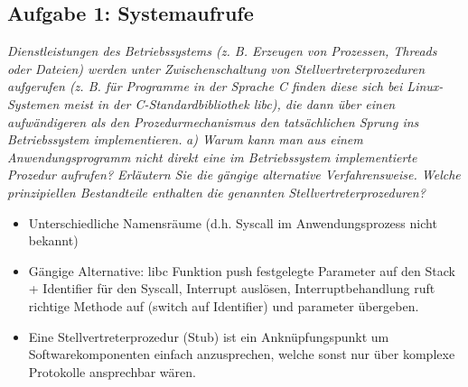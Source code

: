 \documentclass[a4paper]{article}
\begin{document}
\subsection{Aufgabe 1: Systemaufrufe}
\textit{Dienstleistungen des Betriebssystems (z. B. Erzeugen von Prozessen, Threads oder Dateien) werden unter Zwischenschaltung von Stellvertreterprozeduren aufgerufen (z. B. für Programme in der Sprache C finden diese sich bei Linux-Systemen meist in der C-Standardbibliothek libc), die dann über einen aufwändigeren als den Prozedurmechanismus den tatsächlichen Sprung ins Betriebssystem implementieren.}
\vspace{10mm}
\textit{a) Warum kann man aus einem Anwendungsprogramm nicht direkt eine im Betriebssystem implementierte Prozedur aufrufen? Erläutern Sie die gängige alternative Verfahrensweise. Welche prinzipiellen Bestandteile enthalten die genannten Stellvertreterprozeduren?}
\vspace{10mm}
\begin{itemize}
    \item Unterschiedliche Namensräume (d.h. Syscall im Anwendungsprozess nicht bekannt)
    \item Gängige Alternative: libc Funktion push festgelegte Parameter auf den Stack + Identifier für den Syscall, Interrupt auslösen, Interruptbehandlung ruft richtige Methode auf (switch auf Identifier) und parameter übergeben.
    \item Eine Stellvertreterprozedur (Stub) ist ein Anknüpfungspunkt um Softwarekomponenten einfach anzusprechen, welche sonst nur über komplexe Protokolle ansprechbar wären.
\end{itemize}
\end{document}
